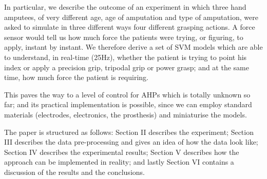 In particular, we describe the outcome of an experiment in which three
hand amputees, of very different age, age of amputation and type of
amputation, were asked to simulate in three different ways four
different grasping actions. A force sensor would tell us how much
force the patients were trying, or figuring, to apply, instant by
instant. We therefore derive a set of SVM models which are able to
understand, in real-time (25Hz), whether the patient is trying to
point his index or apply a precision grip, tripodal grip or power
grasp; and at the same time, how much force the patient is requiring.

This paves the way to a level of control for AHPs which is totally
unknown so far; and its practical implementation is possible, since we
can employ standard materials (electrodes, electronics, the
prosthesis) and miniaturise the models.

The paper is structured as follows: Section II describes the
experiment; Section III describes the data pre-processing and gives an
idea of how the data look like; Section IV describes the experimental
results; Section V describes how the approach can be implemented in
reality; and lastly Section VI contains a discussion of the results
and the conclusions.

